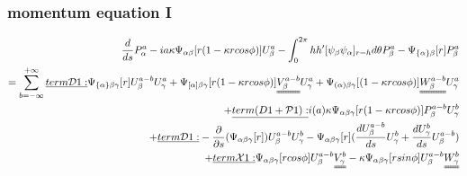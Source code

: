 \documentclass{Note}
\begin{document}
\subsubsection{momentum equation I}
\begin{equation}
\begin{aligned}
{d\over {ds}}P_\alpha^a-ia\kappa \Psi_{\alpha\beta}[r(1-\kappa rcos\phi)]U_\beta^a
-\int_0^{2\pi} hh'[ \psi_\beta \psi_\alpha ]_{r=h} d\theta P_\beta^a-\Psi_{\{\alpha\}\beta}[r] P_\beta^a\\
= \sum_{b=-\infty}^{+\infty}
\underline{term \mathcal{D}1:}  \Psi_{\{\alpha\}\beta\gamma} [r]U_\beta^{a-b}U_\gamma^a
+\Psi_{[\alpha]\beta\gamma} [r(1-\kappa rcos\phi)]\uuline{V_\beta^{a-b}}U_\gamma^a
+ \Psi_{(\alpha)\beta\gamma} [(1-\kappa rcos\phi)]\uuline{W_\beta^{a-b}}U_\gamma^a\\
+\underline{term\mathcal({D}1+\mathcal{P}1):}  i(a)\kappa \Psi_{\alpha\beta\gamma}[r(1-\kappa r cos\phi)]P_\beta^{a-b}U_\gamma^{b}\\
+\underline{term \mathcal{D}1:} -{{\partial }\over {\partial s}}(\Psi_{\alpha\beta\gamma}[r])U_\beta^{a-b}U_\gamma^{b}
-\Psi_{\alpha\beta\gamma}[r]({{d U_\beta^{a-b} \over {d s}}U_\gamma^{b}}+{dU_\gamma^{b}\over ds}U_\beta^{a-b})\\
+\underline{term \mathcal{X}1:} \Psi_{\alpha\beta\gamma}[rcos\phi]U_\beta^{a-b}\uuline{V_\gamma^b}-\kappa \Psi_{\alpha\beta\gamma}[r sin\phi]U_\beta^{a-b}\uuline{W_\gamma^b}\\
\end{aligned}
\end{equation}
\end{document}
